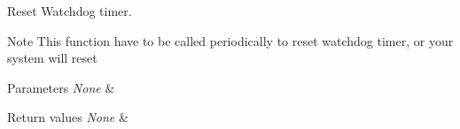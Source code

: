 Reset Watchdog timer. 

\begin{DoxyNote}{Note}
This function have to be called periodically to reset watchdog timer, or your system will reset 
\end{DoxyNote}

\begin{DoxyParams}{Parameters}
{\em None} & \\
\hline
\end{DoxyParams}

\begin{DoxyRetVals}{Return values}
{\em None} & \\
\hline
\end{DoxyRetVals}

